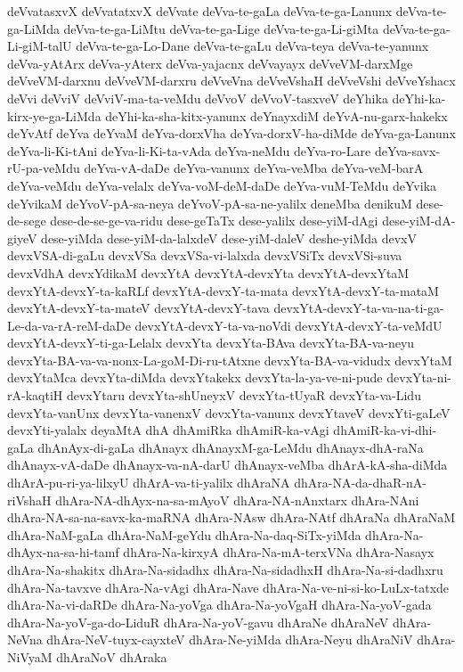 {deVvatasxvX
deVvatatxvX
deVvate
deVva-te-gaLa
deVva-te-ga-Lanunx
deVva-te-ga-LiMda
deVva-te-ga-LiMtu
deVva-te-ga-Lige
deVva-te-ga-Li-giMta
deVva-te-ga-Li-giM-talU
deVva-te-ga-Lo-Dane
deVva-te-gaLu
deVva-teya
deVva-te-yanunx
deVva-yAtArx
deVva-yAterx
deVva-yajacnx
deVvayayx
deVveVM-darxMge
deVveVM-darxnu
deVveVM-darxru
deVveVna
deVveVshaH
deVveVshi
deVveYshacx
deVvi
deVviV
deVviV-ma-ta-veMdu
deVvoV
deVvoV-tasxveV
deYhika
deYhi-ka-kirx-ye-ga-LiMda
deYhi-ka-sha-kitx-yanunx
deYnayxdiM
deYvA-nu-garx-hakekx
deYvAtf
deYva
deYvaM
deYva-dorxVha
deYva-dorxV-ha-diMde
deYva-ga-Lanunx
deYva-li-Ki-tAni
deYva-li-Ki-ta-vAda
deYva-neMdu
deYva-ro-Lare
deYva-savx-rU-pa-veMdu
deYva-vA-daDe
deYva-vanunx
deYva-veMba
deYva-veM-barA
deYva-veMdu
deYva-velalx
deYva-voM-deM-daDe
deYva-vuM-TeMdu
deYvika
deYvikaM
deYvoV-pA-sa-neya
deYvoV-pA-sa-ne-yalilx
deneMba
denikuM
dese-de-sege
dese-de-se-ge-va-ridu
dese-geTaTx
dese-yalilx
dese-yiM-dAgi
dese-yiM-dA-giyeV
dese-yiMda
dese-yiM-da-lalxdeV
dese-yiM-daleV
deshe-yiMda
devxV
devxVSA-di-gaLu
devxVSa
devxVSa-vi-lalxda
devxVSiTx
devxVSi-suva
devxVdhA
devxYdikaM
devxYtA
devxYtA-devxYta
devxYtA-devxYtaM
devxYtA-devxY-ta-kaRLf
devxYtA-devxY-ta-mata
devxYtA-devxY-ta-mataM
devxYtA-devxY-ta-mateV
devxYtA-devxY-tava
devxYtA-devxY-ta-va-na-ti-ga-Le-da-va-rA-reM-daDe
devxYtA-devxY-ta-va-noVdi
devxYtA-devxY-ta-veMdU
devxYtA-devxY-ti-ga-Lelalx
devxYta
devxYta-BAva
devxYta-BA-va-neyu
devxYta-BA-va-va-nonx-La-goM-Di-ru-tAtxne
devxYta-BA-va-vidudx
devxYtaM
devxYtaMca
devxYta-diMda
devxYtakekx
devxYta-la-ya-ve-ni-pude
devxYta-ni-rA-kaqtiH
devxYtaru
devxYta-shUneyxV
devxYta-tUyaR
devxYta-va-Lidu
devxYta-vanUnx
devxYta-vanenxV
devxYta-vanunx
devxYtaveV
devxYti-gaLeV
devxYti-yalalx
deyaMtA
dhA
dhAmiRka
dhAmiR-ka-vAgi
dhAmiR-ka-vi-dhi-gaLa
dhAnAyx-di-gaLa
dhAnayx
dhAnayxM-ga-LeMdu
dhAnayx-dhA-raNa
dhAnayx-vA-daDe
dhAnayx-va-nA-darU
dhAnayx-veMba
dhArA-kA-sha-diMda
dhArA-pu-ri-ya-lilxyU
dhArA-va-ti-yalilx
dhAraNA
dhAra-NA-da-dhaR-nA-riVshaH
dhAra-NA-dhAyx-na-sa-mAyoV
dhAra-NA-nAnxtarx
dhAra-NAni
dhAra-NA-sa-na-savx-ka-maRNA
dhAra-NAsw
dhAra-NAtf
dhAraNa
dhAraNaM
dhAra-NaM-gaLa
dhAra-NaM-geYdu
dhAra-Na-daq-SiTx-yiMda
dhAra-Na-dhAyx-na-sa-hi-tamf
dhAra-Na-kirxyA
dhAra-Na-mA-terxVNa
dhAra-Nasayx
dhAra-Na-shakitx
dhAra-Na-sidadhx
dhAra-Na-sidadhxH
dhAra-Na-si-dadhxru
dhAra-Na-tavxve
dhAra-Na-vAgi
dhAra-Nave
dhAra-Na-ve-ni-si-ko-LuLx-tatxde
dhAra-Na-vi-daRDe
dhAra-Na-yoVga
dhAra-Na-yoVgaH
dhAra-Na-yoV-gada
dhAra-Na-yoV-ga-do-LiduR
dhAra-Na-yoV-gavu
dhAraNe
dhAraNeV
dhAra-NeVna
dhAra-NeV-tuyx-cayxteV
dhAra-Ne-yiMda
dhAra-Neyu
dhAraNiV
dhAra-NiVyaM
dhAraNoV
dhAraka
}
